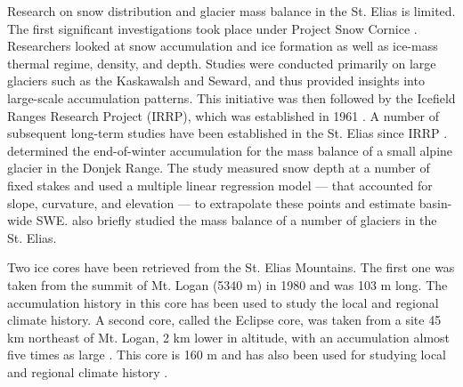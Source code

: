 \documentclass[12pt]{article}
\begin{document}
Research on snow distribution and glacier mass balance in the St. Elias is limited. The first significant investigations took place under Project Snow Cornice \citep{Wood1948}. Researchers looked at snow accumulation and ice formation as well as ice-mass thermal regime, density, and depth. Studies were conducted primarily on large glaciers such as the Kaskawalsh and Seward, and thus provided insights into large-scale accumulation patterns. This initiative was then followed by the Icefield Ranges Research Project (IRRP), which was established in 1961 \citep{Danby2003}. A number of subsequent long-term studies have been established in the St. Elias since IRRP \citep[e.g.][]{Clarke1984, Paoli2009}. \cite{Wheler2014} determined the end-of-winter accumulation for the mass balance of a small alpine glacier in the Donjek Range. The study measured snow depth at a number of fixed stakes and used a multiple linear regression model --- that accounted for slope, curvature, and elevation --- to extrapolate these points and estimate basin-wide SWE. \cite{Arendt2008} also briefly studied the mass balance of a number of glaciers in the St. Elias.

Two ice cores have been retrieved from the St. Elias Mountains. The first one was taken from the summit of Mt. Logan (5340 m) in 1980 and was 103 m long. The accumulation history in this core has been used to study the local \citep{Holdsworth1991} and regional \citep{Moore2002} climate history. A second core, called the Eclipse core, was taken from a site 45 km northeast of Mt. Logan, 2 km lower in altitude, with an accumulation almost five times as large \citep{Wake2002}. This core is 160 m and has also been used for studying local and regional climate history \citep{Wake2002}. 
\end{document}
